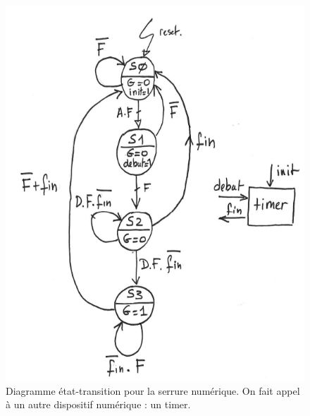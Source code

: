 \documentclass[a4paper,11pt]{article}
\begin{document}
\begin{figure}[!h]
  \begin{center}
    \includegraphics[scale=0.5]{./figures/my_solution.png}
  \end{center}
  \caption{Diagramme état-transition pour la serrure numérique. On fait appel à un autre dispositif numérique : un timer.}
  \label{my_solution}
\end{figure}
\end{document}
